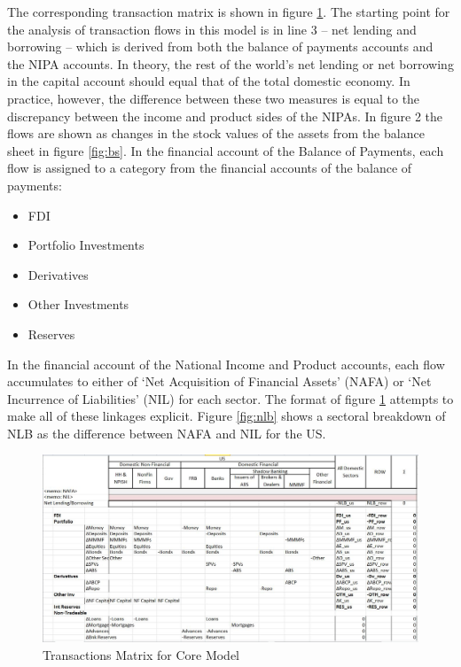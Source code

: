 \documentclass[twoside,a4paper,11pt]{article}
\begin{document}
The corresponding transaction matrix is shown in figure \ref{fig:tx}. The starting point for the analysis of transaction flows in this model is in line 3 -- net lending and borrowing -- which is derived from both the balance of payments accounts and the NIPA accounts. In theory, the rest of the world’s net lending or net borrowing in the capital account should equal that of the total domestic economy. In practice, however, the difference between these two measures is equal to the discrepancy between the income and product sides of the NIPAs. In figure 2 the flows are shown as changes in the stock values of the assets from the balance sheet in figure \ref{fig:bs}.  In the financial account of the Balance of Payments, each flow is assigned to a category from the financial accounts of the balance of payments:
\begin{itemize}
\item[] FDI
\item[] Portfolio Investments
\item[] Derivatives
\item[] Other Investments
\item[] Reserves 
\end{itemize}

In the financial account of the National Income and Product accounts, each flow accumulates to either of `Net Acquisition of Financial Assets' (NAFA) or `Net Incurrence of Liabilities' (NIL) for each sector. The format of figure \ref{fig:tx} attempts to make all of these linkages explicit. Figure \ref{fig:nlb} shows a sectoral breakdown of NLB as the difference between NAFA and NIL for the US.

\begin{figure}
  \includegraphics[width=\linewidth]{trans-matrix.jpg}
  \caption{Transactions Matrix for Core Model}
  \label{fig:tx}
\end{figure}
\end{document}
